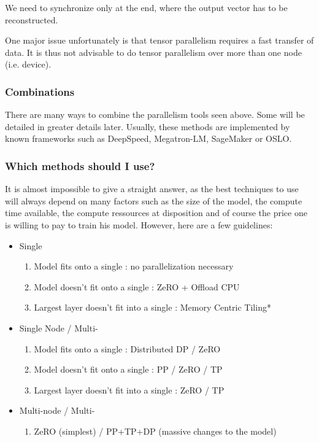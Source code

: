 \documentclass{article}
\begin{document}
We need to synchronize only at the end, where the output vector has to be reconstructed.

One major issue unfortunately is that tensor parallelism requires a fast transfer of data. It is thus not advisable to do tensor parallelism over more than one node (i.e. device).

\subsubsection{Combinations}
There are many ways to combine the parallelism tools seen above. Some will be detailed in greater details later. Usually, these methods are implemented by known frameworks such as DeepSpeed, Megatron-LM, SageMaker or OSLO.

\subsubsection{Which methods should I use?}
It is almost impossible to give a straight answer, as the best techniques to use will always depend on many factors such as the size of the model, the compute time available, the compute ressources at disposition and of course the price one is willing to pay to train his model. However, here are a few guidelines:
\begin{itemize}
  \item Single 
  \begin{enumerate}
    \item Model fits onto a single : no parallelization necessary
    \item Model doesn't fit onto a single : ZeRO + Offload CPU
    \item Largest layer doesn't fit into a single : Memory Centric Tiling*
  \end{enumerate}
  \item Single Node / Multi-
  \begin{enumerate}
    \item Model fits onto a single : Distributed DP / ZeRO
    \item Model doesn't fit onto a single : PP / ZeRO / TP
    \item Largest layer doesn't fit into a single : ZeRO / TP
  \end{enumerate}
  \item Multi-node / Multi-
  \begin{enumerate}
    \item ZeRO (simplest) / PP+TP+DP (massive changes to the model)
  \end{enumerate}
\end{itemize}
\end{document}

